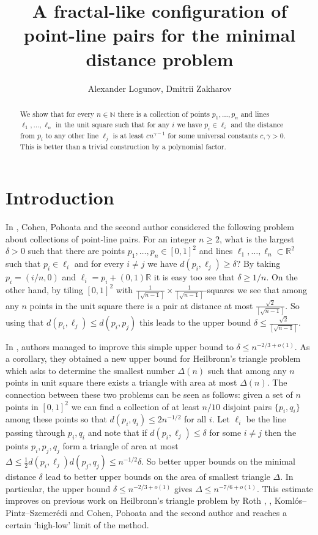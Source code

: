 \documentclass[11pt,letterpaper]{amsart}
\title{A fractal-like configuration of point-line pairs for the minimal distance problem}
\author{Alexander Logunov, Dmitrii Zakharov}
\date{}
\renewcommand{\le}{\leqslant}
\renewcommand{\ge}{\geqslant}
\def\R{\mathbb R}
\def\N{\mathbb N}
\def\d{\delta}
\begin{document}
\begin{abstract}
    We show that for every $n \in \N$ there is a collection of points $p_1, \ldots, p_n$ and lines  $\ell_1, \ldots, \ell_n$ in the unit square such that for any $i$ we have $p_i \in \ell_i$ and the distance from $p_i$ to any other line $\ell_j$ is at least $c n^{\gamma-1}$ for some universal constants $c, \gamma>0$. This is better than a trivial construction by a polynomial factor.
\end{abstract}

\maketitle 

\section{Introduction}

In \cite{cohen2025lower}, Cohen, Pohoata and the second author considered the following problem about collections of point-line pairs. For an integer $n\ge 2$, what is the largest $\d>0$ such that there are points $p_1, \ldots, p_n \in [0,1]^2$ and lines $\ell_1, \ldots, \ell_n \subset \R^2$ such that $p_i \in \ell_i$ and for every $i\neq j$ we have $d(p_i, \ell_j) \ge \d$? By taking $p_i = (i/n, 0)$ and $\ell_i = p_i + (0,1)\R$ it is easy too see that $\d \ge 1/n$. On the other hand, by tiling $[0,1]^2$ with $\frac{1}{[\sqrt{n-1}]}\times \frac{1}{[\sqrt{n-1}]}$-squares we see that among any $n$ points in the unit square there is a pair at distance at most $\frac{\sqrt 2}{[\sqrt{n-1}]}$. So using that $d(p_i,\ell_j) \le d(p_i, p_j)$ this leads to the upper bound $\d \le \frac{\sqrt 2}{[\sqrt{n-1}]}$. 

In \cite{cohen2025lower}, authors managed to improve this simple upper bound to $\d \le n^{-2/3+o(1)}$. As a corollary, they obtained a new upper bound for Heilbronn's triangle problem which asks to determine the smallest number $\Delta(n)$ such that among any $n$ points in unit square there exists a triangle with area at most $\Delta(n)$. The connection between these two problems can be seen as follows: given a set of $n$ points in $[0,1]^2$ we can find a collection of at least $n/10$ disjoint pairs $\{p_i, q_i\}$ among these points so that $d(p_i, q_i) \le2 n^{-1/2}$ for all $i$. Let $\ell_i$ be the line passing through $p_i, q_i$ and note that if $d(p_i, \ell_j) \le \d$ for some $i\neq j$ then the points $p_i, p_j, q_j$ form a triangle of area at most $\Delta\le \frac 12 d(p_i, \ell_j) d(p_j, q_j) \le n^{-1/2}\d$. So better upper bounds on the minimal distance $\d$ lead to better upper bounds on the area of smallest triangle $\Delta$. In particular, the upper bound $\d\le n^{-2/3+o(1)}$ gives $\Delta \le n^{-7/6+o(1)}$.
This estimate improves on previous work on Heilbronn's triangle problem by Roth \cite{roth1972problem2}, \cite{roth1972problem3}, Koml\'os--Pintz--Szemer\'edi \cite{komlos1981heilbronn} and Cohen, Pohoata and the second author \cite{cohen2023new} and reaches a certain `high-low' limit of the method.  
\end{document}
